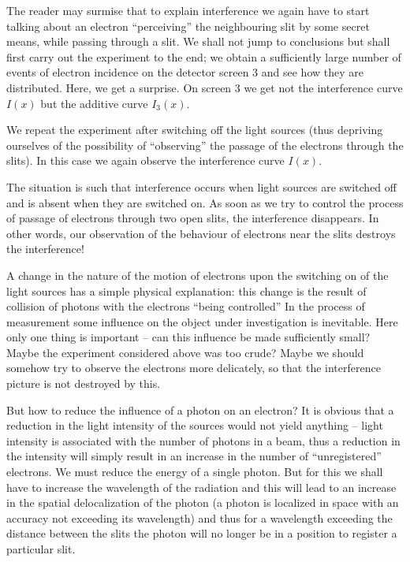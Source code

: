 \documentclass[a4paper,sfsidenotes,colorlinks=true]{tufte-book}
\numberwithin{equation}{section}
\numberwithin{figure}{section}
\begin{document}
The reader may surmise that to explain interference we again have to start talking about an electron ``perceiving'' the neighbouring slit by some secret means, while passing through a slit. We shall not jump to conclusions but shall first carry out the experiment to the end; we obtain a sufficiently large number of events of electron incidence on the detector screen \textsf{3} and see how they are distributed. Here, we get a surprise. On screen \textsf{3} we get not the interference curve $I(x)$ but the additive curve $I_{3}(x)$.


We repeat the experiment after switching off the light sources (thus depriving ourselves of the possibility of ``observing'' the passage of the electrons through the slits). In this case we again observe the interference curve $I(x)$.


The situation is such that interference occurs when light sources are switched off and is absent when they are switched on. As soon as we try to control the process of passage of electrons through two open slits, the interference disappears. In other words, our observation of the behaviour of electrons near the slits destroys the interference!


A change in the nature of the motion of electrons upon the switching on of the light sources has a simple physical explanation: this change is the result of collision of photons with the electrons ``being controlled'' In the process of measurement some influence on the object under investigation is inevitable. Here only one thing is important -- can this influence be made sufficiently
small? Maybe the experiment considered above was too crude? Maybe we should somehow try to observe the electrons more delicately, so that the interference picture is not destroyed by this. 

But how to reduce the influence of a photon on an electron? It is obvious that a reduction in the light intensity of the sources would not yield anything -- light intensity is associated with the number of photons in a beam, thus a reduction in the intensity will simply result in an increase in the number of ``unregistered'' electrons. We must reduce the energy of a single photon. But for this we shall have to increase the wavelength of the radiation and this will lead to an increase in the spatial delocalization of the photon (a photon is localized in space with an accuracy not exceeding its wavelength) and thus for a wavelength exceeding the distance between the slits the photon will no longer be in a position to register a particular slit.
\end{document}
